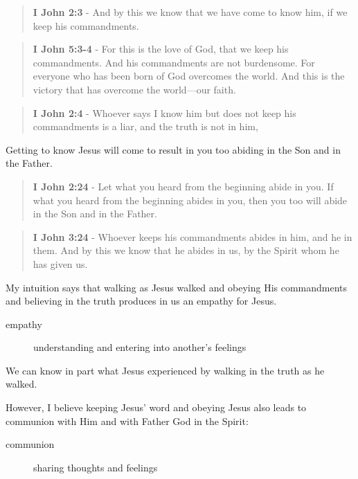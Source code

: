 \documentclass[11pt]{article}
\begin{document}
\begin{quote}
\textbf{I John 2:3} - And by this we know that we have come to know him, if we keep his commandments.
\end{quote}

\begin{quote}
\textbf{I John 5:3-4} - For this is the love of God, that we keep his commandments. And his commandments are not burdensome. For everyone who has been born of God overcomes the world. And this is the victory that has overcome the world—our faith.
\end{quote}

\begin{quote}
\textbf{I John 2:4} - Whoever says I know him but does not keep his commandments is a liar, and the truth is not in him,
\end{quote}

Getting to know Jesus will come to result in you too abiding in the Son and in the Father.

\begin{quote}
\textbf{I John 2:24} - Let what you heard from the beginning abide in you. If what you heard from the beginning abides in you, then you too will abide in the Son and in the Father.
\end{quote}

\begin{quote}
\textbf{I John 3:24} - Whoever keeps his commandments abides in him, and he in them. And by this we know that he abides in us, by the Spirit whom he has given us.
\end{quote}

My intuition says that walking as Jesus walked and obeying His commandments and believing in the truth produces in us an empathy for Jesus.

\begin{description}
\item[{empathy}] understanding and entering into another's feelings
\end{description}

We can know in part what Jesus experienced by walking in the truth as he walked.

However, I believe keeping Jesus' word and obeying Jesus also leads to communion with Him and with Father God in the Spirit:

\begin{description}
\item[{communion}] sharing thoughts and feelings
\end{description}
\end{document}
